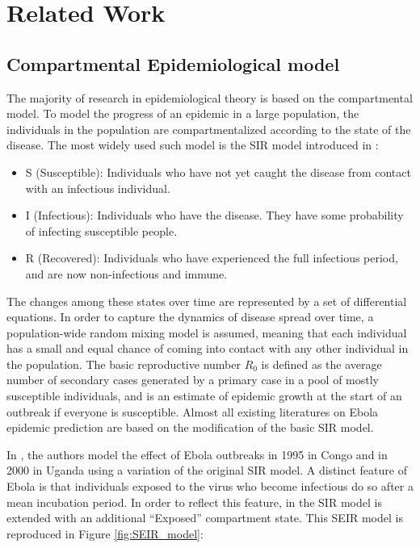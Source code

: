 \documentclass[10pt, journal,onecolumn]{IEEEtran}
\begin{document}

\section{{Related Work}}
\label{sec:RelatedWork}

\subsection{Compartmental Epidemiological model}
\label{SubSec:SIR}

The majority of research in epidemiological theory is based on the compartmental model. To model the
progress of an epidemic in a large population, the individuals in the population are
compartmentalized according to the state of the disease. The most widely used such model is the SIR
model introduced in \citep{very_old_paper}:

\begin{itemize}
\item {S (Susceptible):} Individuals who have not yet caught the disease from contact with an infectious
  individual.
\item {I (Infectious):} Individuals who have the disease. They have some probability of
  infecting susceptible people.
\item {R (Recovered):} Individuals who have experienced the full infectious period, and are
  now non-infectious and immune.
\end{itemize}

The changes among these states over time are represented by a set of differential equations. In
order to capture the dynamics of disease spread over time, a population-wide random mixing model is
assumed, meaning that each individual has a small and equal chance of coming into contact with any
other individual in the population. The basic reproductive number $R_0$ is defined as the average
number of secondary cases generated by a primary case in a pool of mostly susceptible individuals,
and is an estimate of epidemic growth at the start of an outbreak if everyone is susceptible. Almost
all existing literatures \citep{chowell2004basic,legrand2007understanding,gomes2014assessing} on
Ebola epidemic prediction are based on the modification of the basic SIR model.

In \citep{chowell2004basic}, the authors model the effect of Ebola outbreaks in 1995 in Congo and in
2000 in Uganda using a variation of the original SIR model. A distinct feature of Ebola is that
individuals exposed to the virus who become infectious do so after a mean incubation period. In
order to reflect this feature, in the SIR model is extended with an additional ``Exposed''
compartment state. This SEIR model is reproduced in Figure \ref{fig:SEIR_model}:
\end{document}
